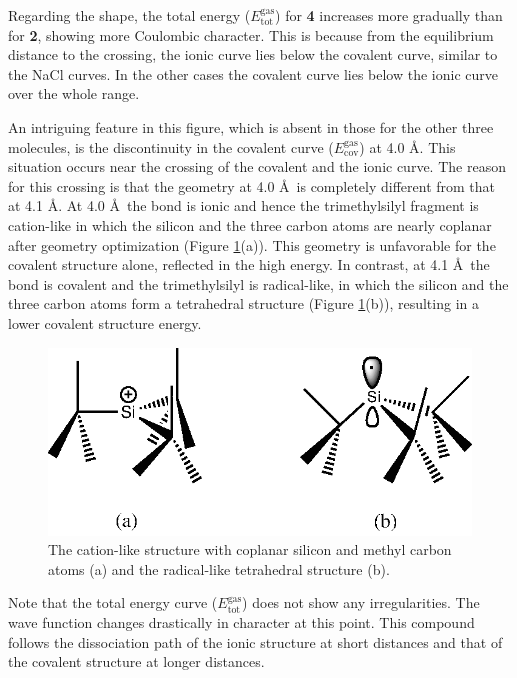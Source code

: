 Regarding the shape, the total energy ($E_\mathrm{tot}^\mathrm{gas}$) for \textbf{4} increases more gradually than for \textbf{2}, showing more Coulombic character. This is because from the equilibrium distance to the crossing, the ionic curve lies below the covalent curve, similar to the NaCl curves. In the other cases the covalent curve lies below the ionic curve over the whole range.

An intriguing feature in this figure, which is absent in those for the other three molecules, is the discontinuity in the covalent curve ($E_\mathrm{cov}^\mathrm{gas}$) at 4.0 \AA. This situation occurs near the crossing of the covalent and the ionic curve. The reason for this crossing is that the geometry at 4.0 \AA\ is completely different from that at 4.1 \AA. At 4.0 \AA\ the bond is ionic and hence the trimethylsilyl fragment is cation-like in which the silicon and the three carbon atoms are nearly coplanar after geometry optimization (Figure \ref{ch3.fig.crossing}(a)). This geometry is unfavorable for the covalent structure alone, reflected in the high energy.  In contrast, at 4.1 \AA\  the bond is covalent and the trimethylsilyl is radical-like, in which the silicon and the three carbon atoms form a tetrahedral structure (Figure \ref{ch3.fig.crossing}(b)), resulting in a lower covalent structure energy. 
\begin{figure}[htbp]
\center
\includegraphics[scale=1.0]{dissociation/figures/crossing.eps}
\caption{The cation-like structure with coplanar silicon and methyl carbon atoms (a) and the radical-like tetrahedral structure (b).}
\label{ch3.fig.crossing}
\end{figure}
Note that the total energy curve ($E_\mathrm{tot}^\mathrm{gas}$) does not show any irregularities.  The wave function changes drastically in character at this point. This compound follows the dissociation path of the ionic structure at short distances and that of the covalent structure at longer distances. 

